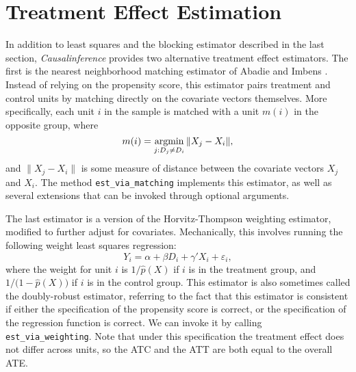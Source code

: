 \documentclass[12pt]{article}
\newcommand{\argmin}{\operatornamewithlimits{argmin}}
\theoremstyle{definition}
\theoremstyle{definition}
\theoremstyle{definition}
\theoremstyle{remark}
\begin{document}

\section{Treatment Effect Estimation} \label{sec.f}

In addition to least squares and the blocking estimator described in the last section, \textit{Causalinference} provides two alternative treatment effect estimators. The first is the nearest neighborhood matching estimator of Abadie and Imbens \citeyear{AbadieImbens.2006}. Instead of relying on the propensity score, this estimator pairs treatment and control units by matching directly on the covariate vectors themselves. More specifically, each unit $i$ in the sample is matched with a unit $m(i)$ in the opposite group, where
\[m(i) = \argmin_{j: D_j \neq D_i} \|X_j - X_i\|,\]
and $\|X_j - X_i\|$ is some measure of distance between the covariate vectors $X_j$ and $X_i$. The method \texttt{est\_via\_matching} implements this estimator, as well as several extensions that can be invoked through optional arguments.

The last estimator is a version of the Horvitz-Thompson weighting estimator, modified to further adjust for covariates. Mechanically, this involves running the following weight least squares regression:
\[Y_i = \alpha + \beta D_i + \gamma' X_i + \varepsilon_i,\]
where the weight for unit $i$ is $1/\hat{p}(X)$ if $i$ is in the treatment group, and $1/\big(1-\hat{p}(X)\big)$ if $i$ is in the control group. This estimator is also sometimes called the doubly-robust estimator, referring to the fact that this estimator is consistent if either the specification of the propensity score is correct, or the specification of the regression function is correct. We can invoke it by calling \texttt{est\_via\_weighting}. Note that under this specification the treatment effect does not differ across units, so the ATC and the ATT are both equal to the overall ATE.
\end{document}
